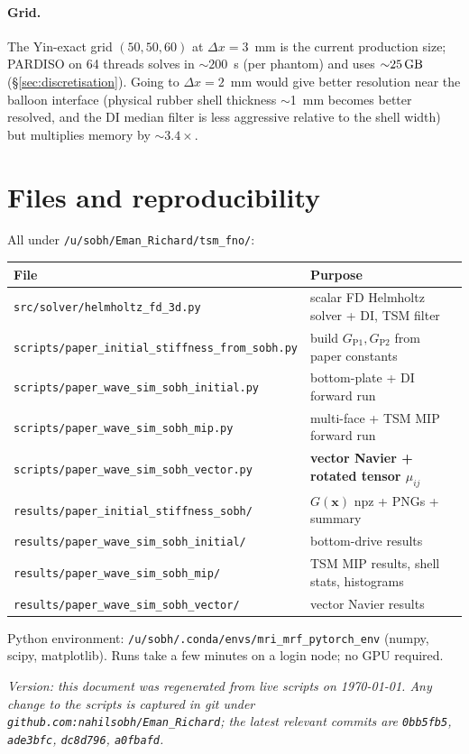 \documentclass[11pt,letterpaper]{article}
\newcommand{\vect}[1]{\boldsymbol{#1}}
\begin{document}
\paragraph{Grid.} The Yin-exact grid $(50, 50, 60)$ at $\Delta x =
3$~mm is the current production size; PARDISO on 64 threads solves
in ${\sim}200$~s (per phantom) and uses ${\sim}\SI{25}{\giga\byte}$
(\S\ref{sec:discretisation}). Going to $\Delta x = 2$~mm would give
better resolution near the balloon interface (physical rubber shell
thickness $\sim$1~mm becomes better resolved, and the DI median
filter is less aggressive relative to the shell width) but multiplies
memory by ${\sim}3.4\times$.

\section{Files and reproducibility}

All under \texttt{/u/sobh/Eman\_Richard/tsm\_fno/}:

\begin{center}
\small
\begin{tabular}{ll}
\toprule
File & Purpose \\
\midrule
\texttt{src/solver/helmholtz\_fd\_3d.py} & scalar FD Helmholtz solver + DI, TSM filter \\
\texttt{scripts/paper\_initial\_stiffness\_from\_sobh.py} & build $G_{\text{P1}}, G_{\text{P2}}$ from paper constants \\
\texttt{scripts/paper\_wave\_sim\_sobh\_initial.py} & bottom-plate + DI forward run \\
\texttt{scripts/paper\_wave\_sim\_sobh\_mip.py} & multi-face + TSM MIP forward run \\
\texttt{scripts/paper\_wave\_sim\_sobh\_vector.py} & \textbf{vector Navier + rotated tensor $\mu_{ij}$} \\
\texttt{results/paper\_initial\_stiffness\_sobh/} & $G(\vect x)$ npz + PNGs + summary \\
\texttt{results/paper\_wave\_sim\_sobh\_initial/} & bottom-drive results \\
\texttt{results/paper\_wave\_sim\_sobh\_mip/} & TSM MIP results, shell stats, histograms \\
\texttt{results/paper\_wave\_sim\_sobh\_vector/} & vector Navier results \\
\bottomrule
\end{tabular}
\end{center}

Python environment: \texttt{/u/sobh/.conda/envs/mri\_mrf\_pytorch\_env}
(numpy, scipy, matplotlib). Runs take a few minutes on a login node;
no GPU required.

\bigskip
\noindent
\emph{Version: this document was regenerated from live scripts on
\today. Any change to the scripts is captured in git under
\texttt{github.com:nahilsobh/Eman\_Richard}; the latest relevant
commits are \texttt{0bb5fb5}, \texttt{ade3bfc}, \texttt{dc8d796},
\texttt{a0fbafd}.}
\end{document}
